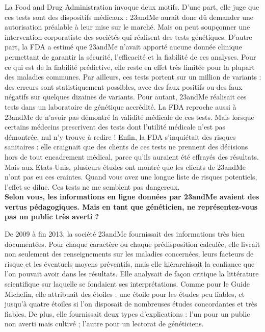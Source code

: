 \documentclass[8pt]{article}
\begin{document}
La Food and Drug Administration invoque deux motifs. D’une part, elle juge que ces tests sont des dispositifs médicaux : 23andMe aurait donc dû demander une autorisation préalable à leur mise sur le marché. Mais on peut soupçonner une intervention corporatiste des sociétés qui réalisent des tests génétiques. D’autre part, la FDA a estimé que 23andMe n’avait apporté aucune donnée clinique permettant de garantir la sécurité, l’efficacité et la fiabilité de ces analyses. Pour ce qui est de la fiabilité prédictive, elle reste en effet très limitée pour la plupart des maladies communes. Par ailleurs, ces tests portent sur un million de variants : des erreurs sont statistiquement possibles, avec des faux positifs ou des faux négatifs sur quelques dizaines de variants. Pour autant, 23andMe réalisait ces tests dans un laboratoire de génétique accrédité. La FDA reproche aussi à 23andMe de n’avoir pas démontré la validité médicale de ces tests. Mais lorsque certains médecins prescrivent des tests dont l’utilité médicale n’est pas démontrée, nul n’y trouve à redire ! Enfin, la FDA s’inquiétait des risques sanitaires : elle craignait que des clients de ces tests ne prennent des décisions hors de tout encadrement médical, parce qu’ils auraient été effrayés des résultats. Mais aux Etats-Unis, plusieurs études ont montré que les clients de 23andMe n’ont pas eu ces craintes. Quand vous avez une longue liste de risques potentiels, l’effet se dilue. Ces tests ne me semblent pas dangereux.\\

\textbf{Selon vous, les informations en ligne données par 23andMe avaient des vertus pédagogiques. Mais en tant que généticien, ne représentez-vous pas un public très averti ?}

De 2009 à fin 2013, la société 23andMe fournissait des informations très bien documentées. Pour chaque caractère ou chaque prédisposition calculée, elle livrait non seulement des renseignements sur les maladies concernées, leurs facteurs de risque et les éventuels moyens préventifs, mais elle hiérarchisait la confiance que l’on pouvait avoir dans les résultats. Elle analysait de façon critique la littérature scientifique sur laquelle se fondaient ses interprétations. Comme pour le Guide Michelin, elle attribuait des étoiles : une étoile pour les études peu fiables, et jusqu’à quatre étoiles si l’on disposait de nombreuses études concordantes et très fiables. De plus, elle fournissait deux types d’explications : l’un pour un public non averti mais cultivé ; l’autre pour un lectorat de généticiens.\\
\end{document}
